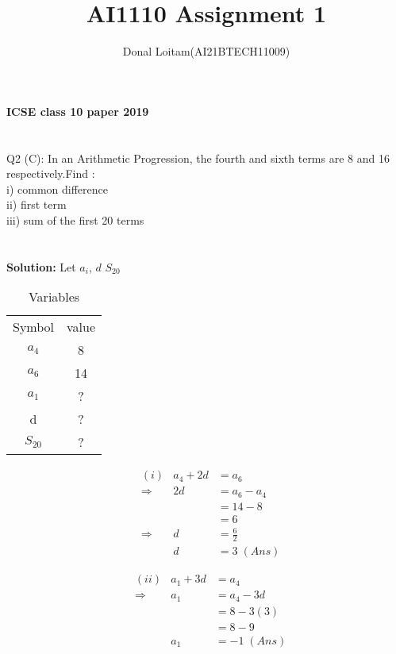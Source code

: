\documentclass[journal, 12pt, twocolumn]{IEEEtran}
\title{AI1110 Assignment 1}
\author{Donal Loitam(AI21BTECH11009)}
\begin{document}
    \maketitle

    \textbf{\large{ICSE class 10 paper 2019}}\\
    \\
    \\
    {Q2 (C):
    In an Arithmetic Progression, the fourth and sixth terms are 8 and 16 respectively.Find :\\
 i) common difference\\
 ii) first term\\
 iii) sum of the first 20 terms}\\\\\\
    \textbf{\large{Solution:}}
    Let $a_i$, 
 \(d\) 
$S_{20}$\\

\begin{table}[h!]
\caption{Variables}
    \centering
    \begin{tabular}{|c|c|}
        \hline
        Symbol & value \\
         $ a_4 $  &  8 \\
         $ a_6  $ &  14 \\
         $ a_1 $ &  ?  \\
          d    &  ?  \\
       $S_{20}$  &  ?  \\
          \hline
    \end{tabular}
\end{table}
    
    \begin{align*}
        &(i)&a_4 + 2d &= a_6\\
        &\Rightarrow & 2d &= a_6 - a_4\\
        &            &    &= 14 - 8\\
        &            &    &= 6 \\
        &\Rightarrow & d  &= \tfrac{6}{2} \\
        &            & d  &= 3 \; (Ans)
    \end{align*}
    
   \begin{align*}
        &(ii)&a_1 + 3d &= a_4\\
        &\Rightarrow & a_1 &= a_4 - 3d\\
        &            &     &=  8 - 3(3)\\
        &            &     &=  8 - 9 \\
        &            & a_1 &=  -1 \; (Ans)
    \end{align*}
    
\end{document}
